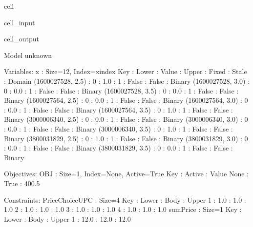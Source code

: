 \documentclass[letterpaper,10pt,english]{jupyterBook}
\begin{document}
\begin{sphinxuseclass}{cell}\begin{sphinxVerbatimInput}

\begin{sphinxuseclass}{cell_input}
\begin{sphinxVerbatim}[commandchars=\\\{\}]
  

\end{sphinxVerbatim}

\end{sphinxuseclass}\end{sphinxVerbatimInput}
\begin{sphinxVerbatimOutput}

\begin{sphinxuseclass}{cell_output}
\begin{sphinxVerbatim}[commandchars=\\\{\}]
Model unknown

  Variables:
    x : Size=12, Index=x\PYGZus{}index
        Key               : Lower : Value : Upper : Fixed : Stale : Domain
        (1600027528, 2.5) :     0 :   1.0 :     1 : False : False : Binary
        (1600027528, 3.0) :     0 :   0.0 :     1 : False : False : Binary
        (1600027528, 3.5) :     0 :   0.0 :     1 : False : False : Binary
        (1600027564, 2.5) :     0 :   0.0 :     1 : False : False : Binary
        (1600027564, 3.0) :     0 :   0.0 :     1 : False : False : Binary
        (1600027564, 3.5) :     0 :   1.0 :     1 : False : False : Binary
        (3000006340, 2.5) :     0 :   0.0 :     1 : False : False : Binary
        (3000006340, 3.0) :     0 :   0.0 :     1 : False : False : Binary
        (3000006340, 3.5) :     0 :   1.0 :     1 : False : False : Binary
        (3800031829, 2.5) :     0 :   1.0 :     1 : False : False : Binary
        (3800031829, 3.0) :     0 :   0.0 :     1 : False : False : Binary
        (3800031829, 3.5) :     0 :   0.0 :     1 : False : False : Binary

  Objectives:
    OBJ : Size=1, Index=None, Active=True
        Key  : Active : Value
        None :   True : 400.5

  Constraints:
    PriceChoiceUPC : Size=4
        Key : Lower : Body : Upper
          1 :   1.0 :  1.0 :   1.0
          2 :   1.0 :  1.0 :   1.0
          3 :   1.0 :  1.0 :   1.0
          4 :   1.0 :  1.0 :   1.0
    sumPrice : Size=1
        Key : Lower : Body : Upper
          1 :  12.0 : 12.0 :  12.0
\end{sphinxVerbatim}

\end{sphinxuseclass}\end{sphinxVerbatimOutput}

\end{sphinxuseclass}
\sphinxstepscope
\end{document}
